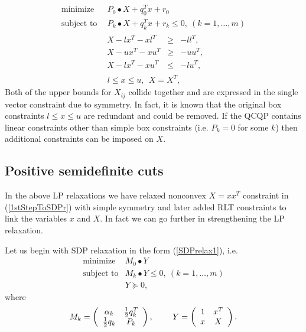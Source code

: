 \documentclass[12pt]{book}
\theoremstyle{definition}
\begin{document}
 \begin{equation}
\label{RLTrelax1} 
\begin{array}{ll}
\mbox{minimize}&\ \ P_0\bullet X + q_0^Tx + r_0\\
\mbox{subject to}&\ \ P_k\bullet X+ q_k^Tx + r_k \leq 0, \  (k = 1,\dots ,m)\\
		& \begin{array}{lcl}
		 X - lx^T - xl^T & \geq & -ll^T, \\
		 X - ux^T - xu^T & \geq & -uu^T, \\
		 X - lx^T - xu^T & \leq & -lu^T, 
		 \end{array}\\
 		&\ \ l\leq x \leq u, \ \  X = X^T,
\end{array} 
\end{equation}
Both of the upper bounds for $X_{ij}$ collide together and are expressed in the single vector constraint due to symmetry.
In fact, it is known that the original box constraints $l\leq x\leq u$ are redundant and could be removed.
If the QCQP contains linear constraints other than simple box constraints (i.e. $P_k=0$ for some $k$) then additional constraints can be imposed on $X$.


\subsection{Positive semidefinite cuts}

In the above LP relaxations we have relaxed nonconvex $X = xx^T$ constraint in (\ref{1stStepToSDPr}) with simple symmetry and later added RLT constraints to link the variables $x$ and $X$. In fact we can go further in strengthening the LP relaxation. 

Let us begin with SDP relaxation in the form (\ref{SDPrelax1}), i.e. 
\begin{equation*} 
\begin{array}{ll}
\mbox{minimize}& M_0\bullet Y \\
\mbox{subject to}& M_k\bullet Y \leq 0, \  (k = 1,\dots ,m)\\
& Y\succeq 0,
\end{array} 
\end{equation*}
where 
\begin{equation*}
M_k = \left(
\begin{array}{cc}
\alpha_k & {1\over 2}q_k^T \\
{1\over 2}q_k & P_k
\end{array}\right), 
\ \ \ \ \ \ \
Y =  \left(
\begin{array}{cc}
1 & x^T \\
x & X
\end{array}\right).
\end{equation*}
\end{document}
